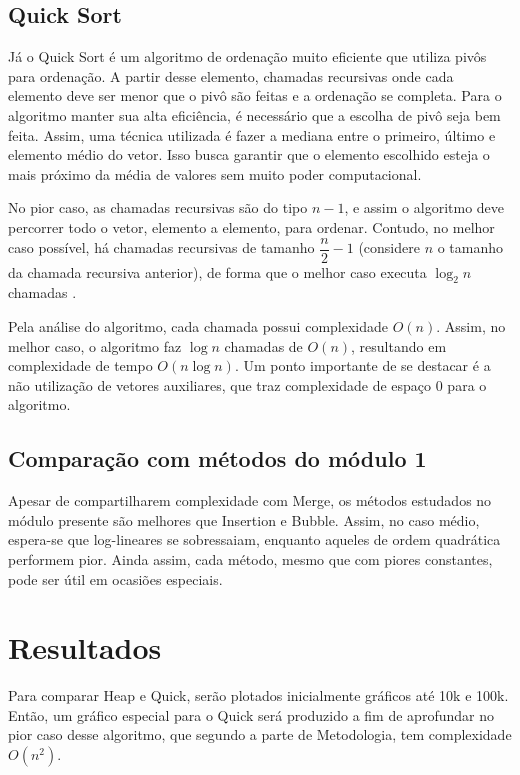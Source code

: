 \documentclass[fontsize=11pt]{article}
\begin{document}
  \subsection{Quick Sort}
    Já o Quick Sort é um algoritmo de ordenação muito eficiente que utiliza pivôs para ordenação. 
    A partir desse elemento, chamadas recursivas onde cada elemento deve ser menor que o pivô 
    são feitas e a ordenação se completa.
    Para o algoritmo manter sua alta eficiência, é necessário que a escolha de pivô seja bem 
    feita. Assim, uma técnica utilizada é fazer a mediana entre o primeiro, último e elemento médio
    do vetor. Isso busca garantir que o elemento escolhido esteja o mais próximo da média de valores 
    sem muito poder computacional.
    
    No pior caso, as chamadas recursivas são do tipo $n-1$, e assim o algoritmo deve percorrer
    todo o vetor, elemento a elemento, para ordenar.
    Contudo, no melhor caso possível, há chamadas recursivas de tamanho $\dfrac{n}{2} - 1$ 
    (considere $n$ o tamanho da chamada recursiva anterior), de forma
    que o melhor caso executa $\log_2 n$ chamadas \cite{moacir}.
    
    Pela análise do algoritmo, cada chamada possui complexidade $O(n)$. Assim, no melhor caso, 
    o algoritmo faz $\log n$ chamadas de $O(n)$, resultando em complexidade de tempo $O(n\log n)$.
    Um ponto importante de se destacar é a não utilização de vetores auxiliares, que 
    traz complexidade de espaço 0 para o algoritmo.
  \subsection{Comparação com métodos do módulo 1}  
    Apesar de compartilharem complexidade com Merge, os métodos estudados 
    no módulo presente são melhores que Insertion e Bubble. Assim, no caso médio,
    espera-se que log-lineares se sobressaiam, enquanto aqueles de ordem 
    quadrática performem pior. Ainda assim, cada método, mesmo que com piores
    constantes, pode ser útil em ocasiões especiais.
\section{Resultados}
  Para comparar Heap e Quick, serão plotados inicialmente gráficos até 10k e 100k.
  Então, um gráfico especial para o Quick será produzido a fim de aprofundar
  no pior caso desse algoritmo, que segundo a parte de Metodologia, tem 
  complexidade $O(n^2)$.
\end{document}
